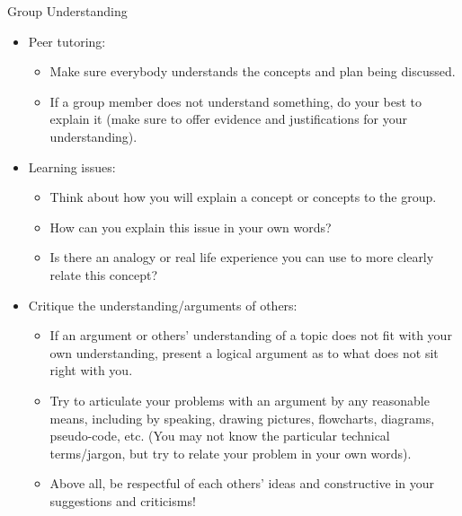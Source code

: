 \documentclass[oneside,letterpaper,11pt]{exam}
\begin{document}
\begin{center}
	\vspace{5pt}
	{Group Understanding}
	\vspace{5pt}
\end{center}
\begin{itemize}
\item[] Peer tutoring:
\begin{itemize}
\item[] Make sure everybody understands the concepts and plan being discussed.\\[-15pt]
\item[] If a group member does not understand something, do your best to explain it (make sure to offer evidence and justifications for your understanding).
\end{itemize}

\item[]
{\noindent Learning issues:}
\begin{itemize}
\item[] Think about how you will explain a concept or concepts to the group.\\[-15pt]
\item[] How can you explain this issue in your own words?\\[-15pt]
\item[] Is there an analogy or real life experience you can use to more clearly relate this concept?
\end{itemize}

\item[] {\noindent Critique the understanding/arguments of others:}
\begin{itemize}
\item[] If an argument or others' understanding of a topic does not fit with your own understanding, present a logical argument as to what does not sit right with you.\\[-15pt]
\item[] Try to articulate your problems with an argument by any reasonable means, including by speaking, drawing pictures, flowcharts, diagrams, pseudo-code, etc. (You may not know the particular technical terms/jargon, but try to relate your problem in your own words).\\[-15pt]
\item[] Above all, be respectful of each others' ideas and constructive in your suggestions and criticisms!
\end{itemize}

\end{itemize}
\end{document}
